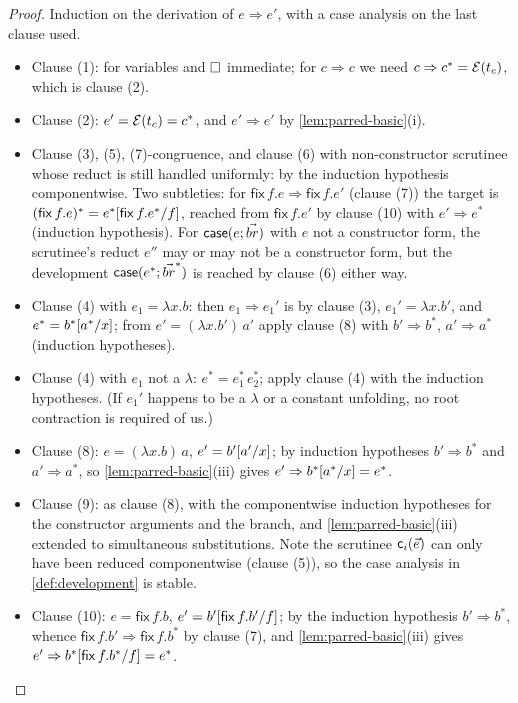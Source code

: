 \begin{proof}
Induction on the derivation of $e \Rightarrow e'$, with a case analysis
on the last clause used.
\begin{itemize}[leftmargin=2em]
\item Clause (1): for variables and $\square$ immediate; for $c \Rightarrow
  c$ we need $c \Rightarrow c^{\ast} = \mathcal{E}(t_c)$, which is clause
  (2).
\item Clause (2): $e' = \mathcal{E}(t_c) = c^{\ast}$, and $e' \Rightarrow e'$
  by \cref{lem:parred-basic}(i).
\item Clause (3), (5), (7)-congruence, and clause (6) with non-constructor
  scrutinee whose reduct is still handled uniformly: by the induction
  hypothesis componentwise.  Two subtleties: for
  $\mathsf{fix}\,f.e \Rightarrow \mathsf{fix}\,f.e'$ (clause (7)) the
  target is $(\mathsf{fix}\,f.e)^{\ast} =
  e^{\ast}[\mathsf{fix}\,f.e^{\ast}/f]$, reached from
  $\mathsf{fix}\,f.e'$ by clause (10) with $e' \Rightarrow e^{\ast}$
  (induction hypothesis).  For $\mathsf{case}(e; \vec{br})$ with $e$ not
  a constructor form, the scrutinee's reduct $e''$ may or may not be a
  constructor form, but the development $\mathsf{case}(e^{\ast};
  \vec{br}^{\ast})$ is reached by clause (6) either way.
\item Clause (4) with $e_1 = \lambda x.b$: then $e_1 \Rightarrow e_1'$
  is by clause (3), $e_1' = \lambda x.b'$, and $e^{\ast} =
  b^{\ast}[a^{\ast}/x]$; from $e' = (\lambda x.b')\,a'$ apply
  clause (8) with $b' \Rightarrow b^{\ast}$, $a' \Rightarrow a^{\ast}$
  (induction hypotheses).
\item Clause (4) with $e_1$ not a $\lambda$: $e^{\ast} =
  e_1^{\ast}\,e_2^{\ast}$; apply clause (4) with the induction
  hypotheses.  (If $e_1' $ happens to be a $\lambda$ or a constant
  unfolding, no root contraction is required of us.)
\item Clause (8): $e = (\lambda x.b)\,a$, $e' = b'[a'/x]$; by
  induction hypotheses $b' \Rightarrow b^{\ast}$ and $a' \Rightarrow
  a^{\ast}$, so \cref{lem:parred-basic}(iii) gives $e' \Rightarrow
  b^{\ast}[a^{\ast}/x] = e^{\ast}$.
\item Clause (9): as clause (8), with the componentwise induction
  hypotheses for the constructor arguments and the branch, and
  \cref{lem:parred-basic}(iii) extended to simultaneous substitutions.
  Note the scrutinee $\mathsf{c}_i(\vec{e})$ can only have been reduced
  componentwise (clause (5)), so the case analysis in
  \cref{def:development} is stable.
\item Clause (10): $e = \mathsf{fix}\,f.b$, $e' =
  b'[\mathsf{fix}\,f.b'/f]$; by the induction hypothesis $b'
  \Rightarrow b^{\ast}$, whence $\mathsf{fix}\,f.b' \Rightarrow
  \mathsf{fix}\,f.b^{\ast}$ by clause (7), and
  \cref{lem:parred-basic}(iii) gives $e' \Rightarrow
  b^{\ast}[\mathsf{fix}\,f.b^{\ast}/f] = e^{\ast}$.
\end{itemize}
\end{proof}

